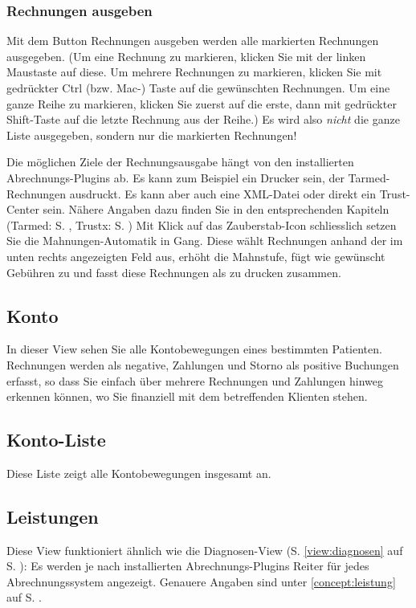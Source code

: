 \subsubsection{Rechnungen ausgeben}
Mit dem Button \glqq Rechnungen ausgeben\grqq{} werden alle markierten Rechnungen ausgegeben. (Um eine Rechnung zu markieren, klicken Sie mit der linken Maustaste auf diese. Um mehrere Rechnungen zu markieren, klicken Sie mit gedrückter Ctrl (bzw. Mac-) Taste auf die gewünschten Rechnungen. Um eine ganze Reihe zu markieren, klicken Sie zuerst auf die erste, dann mit gedrückter Shift-Taste auf die letzte Rechnung aus der Reihe.) Es wird also \textit{nicht} die ganze Liste ausgegeben, sondern nur die markierten Rechnungen!


Die möglichen Ziele der Rechnungsausgabe hängt von den installierten Abrechnungs-Plugins ab. Es kann zum Beispiel ein Drucker sein, der Tarmed-Rechnungen ausdruckt. Es kann aber auch eine XML-Datei oder direkt ein Trust-Center sein. Nähere Angaben dazu finden Sie in den entsprechenden Kapiteln (Tarmed: S. \pageref{arzttarife}, Trustx: S. \pageref{trustx})
\bigskip
Mit Klick auf das Zauberstab-Icon schliesslich setzen Sie die Mahnungen-Automatik in Gang. Diese wählt Rechnungen anhand der im unten rechts angezeigten Feld aus, erhöht die Mahnstufe, fügt wie gewünscht Gebühren zu und fasst diese Rechnungen als \glqq zu drucken\grqq{} zusammen.

\subsection{Konto}
In dieser View sehen Sie alle Kontobewegungen eines bestimmten Patienten.
Rechnungen werden als negative, Zahlungen und Storno als positive
Buchungen erfasst, so dass Sie einfach über mehrere Rechnungen und Zahlungen
hinweg erkennen können, wo Sie finanziell mit dem betreffenden Klienten stehen.

\subsection{Konto-Liste}
Diese Liste zeigt alle Kontobewegungen insgesamt an.

\subsection{Leistungen}
Diese View funktioniert ähnlich wie die Diagnosen-View (S. \ref{view:diagnosen} auf S. \pageref{view:diagnosen}): Es werden je nach installierten Abrechnungs-Plugins Reiter für jedes Abrechnungssystem angezeigt. Genauere Angaben sind unter \ref{concept:leistung} auf S. \pageref{concept:leistung}.



